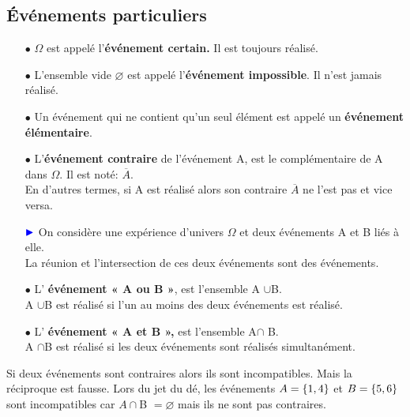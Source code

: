 \subsection*{Événements particuliers}
\begin{definition}

\begin{itemize}
\item[$  \bullet$] $ \Omega $ est appelé l'\textbf{événement certain.}  Il  est toujours réalisé.
\item[$  \bullet$]L'ensemble vide  $ \varnothing $ est appelé l'\textbf{événement impossible}.  Il   n'est jamais réalisé.
\item[$  \bullet$] Un événement qui ne contient qu'un seul élément est appelé un \textbf{événement élémentaire}. 
\item[$  \bullet$]L'\textbf{événement contraire } de l'événement A, est le complémentaire de A dans $ \Omega $. 
Il est noté:  $ \overline{A} $.\\ En d'autres termes, si A est réalisé alors son contraire  $ \overline{A} $ ne l'est pas et vice versa.

 $\color{blue}\blacktriangleright $ On considère une expérience d'univers  $ \Omega $ et deux événements A et B liés à elle.\\
La réunion et l'intersection de  ces deux événements sont des événements.

\item[$  \bullet$] L'\textbf{ événement  « A ou B »}, est l'ensemble A  $ \cup $B.\\
A  $ \cup $B  est réalisé si l'un au moins des deux événements est réalisé.
\item[$  \bullet$] L'\textbf{ événement  « A et B »,} est l'ensemble A$ \cap $ B.\\
A  $ \cap $B  est réalisé si les   deux événements sont réalisés  simultanément.


\end{itemize}

\end{definition}

\begin{remark}

  Si deux événements sont contraires alors ils sont incompatibles. Mais la réciproque est fausse. Lors du jet du dé, les événements $ A=\left\{1,4\right\} $  et $ B=\left\{5,6\right\} $ sont incompatibles car $ A\cap $B $ = \varnothing$  mais  ils ne sont pas contraires.
\end{remark}

